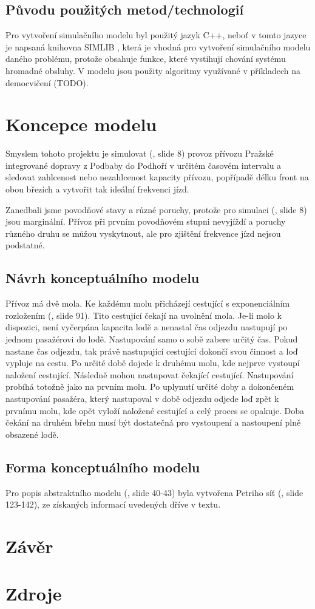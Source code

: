 \documentclass[11pt,a4paper]{article}
\begin{document}
  \subsection{Původu použitých metod/technologií}
  Pro vytvoření simulačního modelu byl použitý jazyk C++, neboť v tomto jazyce je napsaná knihovna SIMLIB \cite{SIMLIB},
  která je vhodná pro vytvoření simulačního modelu daného problému, protože obsahuje funkce, které vystihují
  chování systému hromadné obsluhy. V modelu jsou použity algoritmy využívané v příkladech na democvičení (TODO).

  \section{Koncepce modelu}
  Smyslem tohoto projektu je simulovat (\cite{SLAJD}, slide 8) provoz přívozu Pražské integrované dopravy
  z Podbaby do Podhoří v určitém časovém intervalu a sledovat zahlcenost nebo nezahlcenost kapacity přívozu,
  popřípadě délku front na obou březích a vytvořit tak ideální frekvenci jízd.

  Zanedbali jsme povodňové stavy a různé poruchy, protože pro simulaci (\cite{SLAJD}, slide 8)
  jsou marginální. Přívoz při prvním povodňovém stupni nevyjíždí a poruchy různého druhu se
  můžou vyskytnout, ale pro zjištění frekvence jízd nejsou podstatné.

  \subsection{Návrh konceptuálního modelu}
  Přívoz má dvě mola. Ke každému molu přicházejí cestující s exponenciálním rozložením (\cite{SLAJD}, slide 91).
  Tito cestující čekají na uvolnění mola. Je-li molo k dispozici, není vyčerpána kapacita lodě a nenastal čas odjezdu
  nastupují po jednom pasažérovi do lodě. Nastupování samo o sobě zabere určitý čas. Pokud nastane čas odjezdu, tak právě
  nastupující cestující dokončí svou činnost a loď vypluje na cestu. Po určité době dojede k druhému molu, kde nejprve vystoupí naložení cestující.
  Následně mohou nastupovat čekající cestující. Nastupování probíhá totožně jako na prvním molu.
  Po uplynutí určité doby a dokončeném nastupování pasažéra, který nastupoval v době odjezdu odjede loď zpět k
  prvnímu molu, kde opět vyloží naložené cestující a celý proces se opakuje. Doba čekání na druhém břehu musí být
  dostatečná pro vystoupení a nastoupení plně obsazené lodě.

  \subsection{Forma konceptuálního modelu}

  Pro popis abstraktního modelu (\cite{SLAJD}, slide 40-43) byla vytvořena Petriho síť (\cite{SLAJD}, slide 123-142),
  ze získaných informací uvedených dříve v textu.


	\section{Závěr}

	\section{Zdroje}
		
\end{document}
